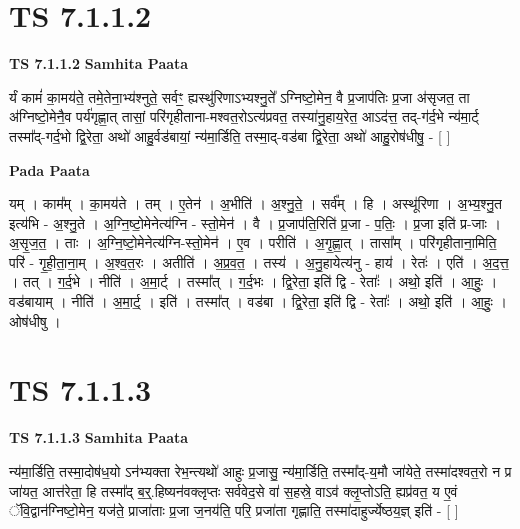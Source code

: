 \documentclass[17pt]{extarticle}
\begin{document}
\section*{ TS 7.1.1.2 }

\textbf{TS 7.1.1.2 } \newline
\textbf{Samhita Paata} \newline

र्यं कामं॑ का॒मय॑ते॒ तमे॒तेना॒भ्य॑श्नुते॒ सर्वꣳ॒॒ ह्यस्थु॑रिणाऽभ्यश्नु॒ते᳚ ऽग्निष्टो॒मेन॒ वै प्र॒जाप॑तिः प्र॒जा अ॑सृजत॒ ता अ॑ग्निष्टो॒मेनै॒व पर्य॑गृह्णा॒त् तासां॒ परि॑गृहीताना-मश्वत॒रोऽत्य॑प्रवत॒ तस्या॑नु॒हाय॒रेत॒ आऽद॑त्त॒ तद्-ग॑र्द॒भे न्य॑मा॒र्ट् तस्मा᳚द्-गर्द॒भो द्वि॒रेता॒ अथो॑ आहु॒र्वड॑बायां॒ न्य॑मा॒र्डिति॒ तस्मा॒द्-वड॑बा द्वि॒रेता॒ अथो॑ आहु॒रोष॑धीषु॒ - [  ] \newline

\textbf{Pada Paata} \newline

यम् । काम᳚म् । का॒मय॑ते । तम् । ए॒तेन॑ । अ॒भीति॑ । अ॒श्नु॒ते॒ । सर्व᳚म् । हि । अस्थू॑रिणा । अ॒भ्य॒श्नु॒त इत्य॑भि - अ॒श्नु॒ते । अ॒ग्नि॒ष्टो॒मेनेत्य॑ग्नि - स्तो॒मेन॑ । वै । प्र॒जाप॑ति॒रिति॑ प्र॒जा - प॒तिः॒ । प्र॒जा इति॑ प्र-जाः । अ॒सृ॒ज॒त॒ । ताः । अ॒ग्नि॒ष्टो॒मेनेत्य॑ग्नि-स्तो॒मेन॑ । ए॒व । परीति॑ । अ॒गृ॒ह्णा॒त् । तासा᳚म् । परि॑गृहीताना॒मिति॒ परि॑ - गृ॒ही॒ता॒ना॒म् । अ॒श्व॒त॒रः । अतीति॑ । अ॒प्र॒व॒त॒ । तस्य॑ । अ॒नु॒हायेत्य॑नु - हाय॑ । रेतः॑ । एति॑ । अ॒द॒त्त॒ । तत् । ग॒र्द॒भे । नीति॑ । अ॒मा॒र्ट् । तस्मा᳚त् । ग॒र्द॒भः । द्वि॒रेता॒ इति॑ द्वि - रेताः᳚ । अथो॒ इति॑ । आ॒हुः॒ । वड॑बायाम् । नीति॑ । अ॒मा॒र्ट्॒ । इति॑ । तस्मा᳚त् । वड॑बा । द्वि॒रेता॒ इति॑ द्वि - रेताः᳚ । अथो॒ इति॑ । आ॒हुः॒ । ओष॑धीषु ।  \newline




\section*{ TS 7.1.1.3 }

\textbf{TS 7.1.1.3 } \newline
\textbf{Samhita Paata} \newline

न्य॑मा॒र्डिति॒ तस्मा॒दोष॑ध॒यो ऽन॑भ्यक्ता रेभ॒न्त्यथो॑ आहुः प्र॒जासु॒ न्य॑मा॒र्डिति॒ तस्मा᳚द्-य॒मौ जा॑येते॒ तस्मा॑दश्वत॒रो न प्र जा॑यत॒ आत्त॑रेता॒ हि तस्मा᳚द् ब॒र्॒.हिष्यन॑वक्लृप्तः सर्ववेद॒से वा॑ स॒हस्रे॒ वाऽव॑ क्लृ॒प्तोऽति॒ ह्यप्र॑वत॒ य ए॒वं ॅवि॒द्वान॑ग्निष्टो॒मेन॒ यज॑ते॒ प्राजा॑ताः प्र॒जा ज॒नय॑ति॒ परि॒ प्रजा॑ता गृह्णाति॒ तस्मा॑दाहुर्ज्येष्ठय॒ज्ञ् इति॑ - [  ] \newline
\end{document}
